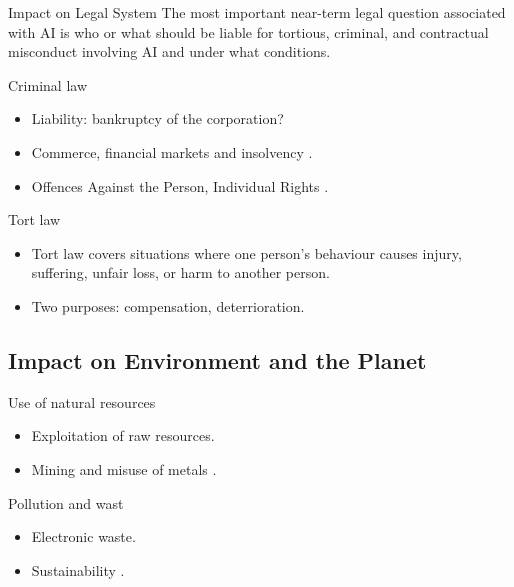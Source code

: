 \documentclass{beamer}
\begin{document}
\begin{frame}{Impact on Legal System}
The most important near-term legal question associated with AI is who or what should be liable for tortious, criminal, and contractual misconduct involving AI and under what conditions.
\end{frame}

\begin{frame}{Criminal law}
\begin{itemize}
    \item Liability: bankruptcy of the corporation? \citep{pagallo2018apples}
    \item Commerce, financial markets and insolvency \citep{farmer2013ecological}.
    \item Offences Against the Person, Individual Rights \citep{citron2018deep}.
\end{itemize}
\end{frame}

\begin{frame}{Tort law}
\begin{itemize}
    \item Tort law covers situations where one person's behaviour causes injury, suffering, unfair loss, or harm 
to another person.
    \item Two purposes: compensation, deterrioration.
\end{itemize}
\end{frame}


\subsection{Impact on Environment and the Planet}

\begin{frame}{Use of natural resources}
\begin{itemize}
    \item Exploitation of raw resources.
    \item Mining and misuse of metals \citep{khakurel2018rise}.
\end{itemize}
\end{frame}

\begin{frame}{Pollution and wast}
\begin{itemize}
    \item Electronic waste.
    \item Sustainability \citep{guiltinan2009creative}.
\end{itemize}
\end{frame}
\end{document}
